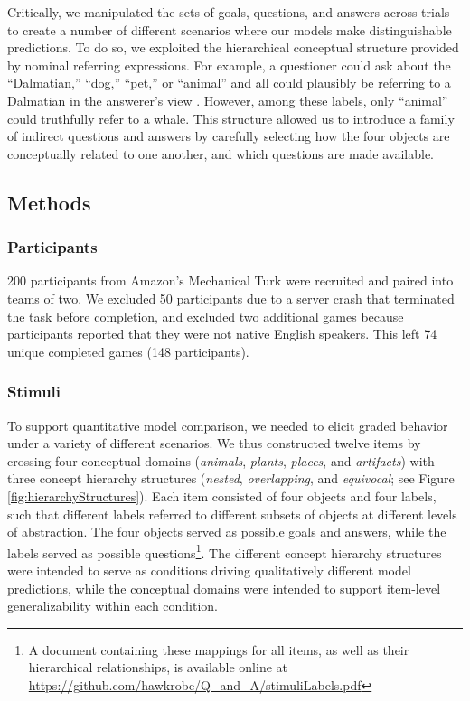\documentclass[12pt, floatsintext, jou]{apa6}
\begin{document}
Critically, we manipulated the sets of goals, questions, and answers across trials to create a number of different scenarios where our models make distinguishable predictions.
To do so, we exploited the hierarchical conceptual structure provided by nominal referring expressions.
For example, a questioner could ask about the ``Dalmatian,'' ``dog,'' ``pet,'' or ``animal'' and all could plausibly be referring to a Dalmatian in the answerer's view \cite{Brown58_HowShallAThingBeCalled,GrafEtAl16_BasicLevel}. 
However, among these labels, only ``animal'' could truthfully refer to a whale.
This structure allowed us to introduce a family of indirect questions and answers by carefully selecting how the four objects are conceptually related to one another, and which questions are made available.



\subsection{Methods}
\subsubsection{Participants} 
200 participants from Amazon's Mechanical Turk were recruited and paired into teams of two.
We excluded 50 participants due to a server crash that terminated the task before completion, and
excluded two additional games because participants reported that they were not native English speakers. 
This left 74 unique completed games (148 participants).

\subsubsection{Stimuli} 

To support quantitative model comparison, we needed to elicit graded behavior under a variety of different scenarios.
We thus constructed twelve items by crossing four conceptual domains (\emph{animals}, \emph{plants}, \emph{places}, and \emph{artifacts}) with three concept hierarchy structures (\emph{nested}, \emph{overlapping}, and \emph{equivocal}; see Figure \ref{fig:hierarchyStructures}).
Each item consisted of four objects and four labels, such that different labels referred to different subsets of objects at different levels of abstraction. 
The four objects served as possible goals and answers, while the labels served as possible questions\footnote{A document containing these mappings for all items, as well as their hierarchical relationships, is available online at \scriptsize\url{https://github.com/hawkrobe/Q\_and\_A/stimuliLabels.pdf}}.
The different concept hierarchy structures were intended to serve as conditions driving qualitatively different model predictions, while the conceptual domains were intended to support item-level generalizability within each condition.
\end{document}
